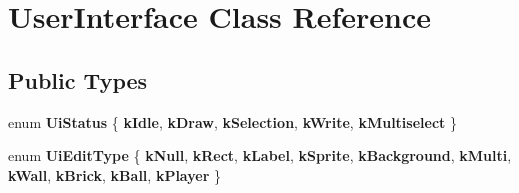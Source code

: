 \hypertarget{class_user_interface}{}\section{User\+Interface Class Reference}
\label{class_user_interface}
\subsection*{Public Types}
\begin{DoxyCompactItemize}
\item 
\mbox{\label{class_user_interface_aa016e2ebb5d7c599df65bbe2e93c2379}} 
enum {\bfseries Ui\+Status} \{ \newline
{\bfseries k\+Idle}, 
{\bfseries k\+Draw}, 
{\bfseries k\+Selection}, 
{\bfseries k\+Write}, 
\newline
{\bfseries k\+Multiselect}
 \}
\item 
\mbox{\label{class_user_interface_a727665d1e9e7abbdf706c131f92575af}} 
enum {\bfseries Ui\+Edit\+Type} \{ \newline
{\bfseries k\+Null}, 
{\bfseries k\+Rect}, 
{\bfseries k\+Label}, 
{\bfseries k\+Sprite}, 
\newline
{\bfseries k\+Background}, 
{\bfseries k\+Multi}, 
{\bfseries k\+Wall}, 
{\bfseries k\+Brick}, 
\newline
{\bfseries k\+Ball}, 
{\bfseries k\+Player}
 \}
\end{DoxyCompactItemize}
